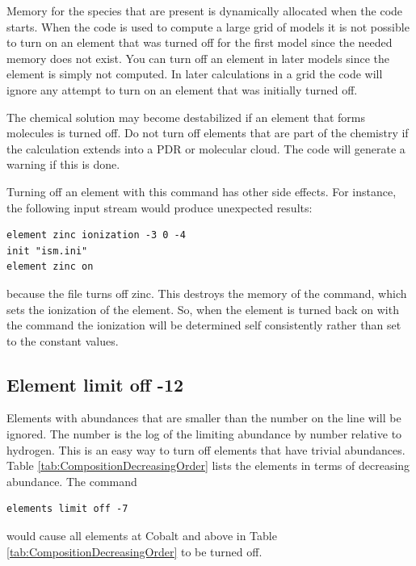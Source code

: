 Memory for the species that are present is dynamically allocated when
the code starts.
When the code is used to compute a large grid of models
it is not possible to turn on an element that was turned off for the first
model since the needed memory does not exist.
You can turn off an element
in later models since the element is simply not computed.
In later
calculations in a grid the code will ignore any attempt to turn on an
element that was initially turned off.

The chemical solution may become destabilized if an element that forms
molecules is turned off.
Do not turn off elements that are part of the
chemistry if the calculation extends into a PDR or molecular cloud.
The
code will generate a warning if this is done.

Turning off an element with this command has other side effects.
For instance, the following input stream would produce unexpected results:
\begin{verbatim}
element zinc ionization -3 0 -4
init "ism.ini"
element zinc on
\end{verbatim}
because the  file turns off zinc.
This destroys the memory of the
 command,
which sets the ionization of the element.
So, when the element is turned back on with the
 command
the ionization will be determined self consistently rather than set to the
constant values.

\subsection{Element limit off -12}
\label{sec:ElementLimitOffCommand}

\noindent Elements with abundances that are
smaller than the number on the line will be ignored.
The number is the log of the limiting abundance by number relative to
hydrogen.
This is an easy way to turn off elements that have trivial
abundances.
Table \ref{tab:CompositionDecreasingOrder} lists the elements
in terms of decreasing abundance.
The command
\begin{verbatim}
elements limit off -7
\end{verbatim}
would cause all elements at Cobalt and above in
Table \ref{tab:CompositionDecreasingOrder} to be turned off.

